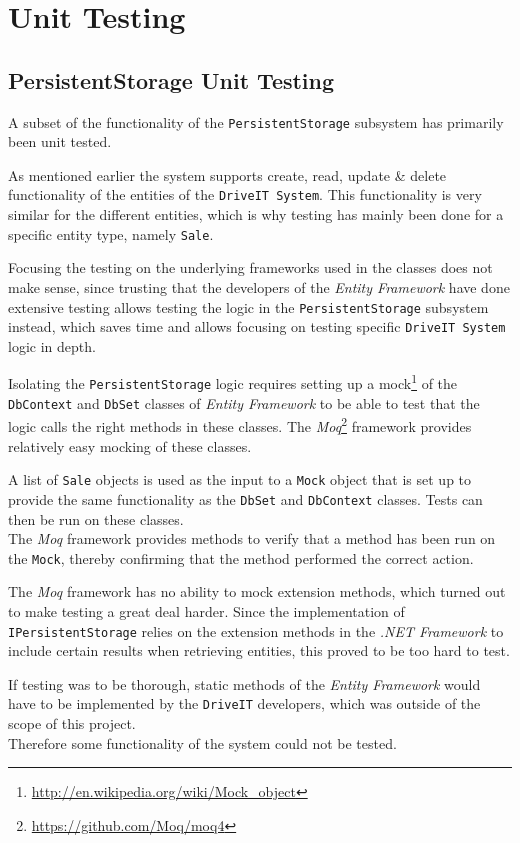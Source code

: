 \section{Unit Testing}
\subsection{PersistentStorage Unit Testing}
A subset of the functionality of the \texttt{PersistentStorage} subsystem has primarily been unit tested.

As mentioned earlier the system supports create, read, update \& delete functionality of the entities of the \texttt{DriveIT System}. This functionality is very similar for the different entities, which is why testing has mainly been done for a specific entity type, namely \texttt{Sale}.

Focusing the testing on the underlying frameworks used in the classes does not make sense, since trusting that the developers of the \textit{Entity Framework} have done extensive testing allows testing the logic in the \texttt{PersistentStorage} subsystem instead, which saves time and allows focusing on testing specific \texttt{DriveIT System} logic in depth.

Isolating the \texttt{PersistentStorage} logic requires setting up a mock\footnote{\url{http://en.wikipedia.org/wiki/Mock_object}} of the \texttt{DbContext} and \texttt{DbSet} classes of \textit{Entity Framework} to be able to test that the logic calls the right methods in these classes. The \textit{Moq}\footnote{\url{https://github.com/Moq/moq4}} framework provides relatively easy mocking of these classes. 

A list of \texttt{Sale} objects is used as the input to a \texttt{Mock} object that is set up to provide the same functionality as the \texttt{DbSet} and \texttt{DbContext} classes. Tests can then be run on these classes.\\
The \textit{Moq} framework provides methods to verify that a method has been run on the \texttt{Mock}, thereby confirming that the method performed the correct action. 

The \textit{Moq} framework has no ability to mock extension methods, which turned out to make testing a great deal harder. Since the implementation of \texttt{IPersistentStorage} relies on the extension methods in the \textit{.NET Framework} to include certain results when retrieving entities, this proved to be too hard to test. 

If testing was to be thorough, static methods of the \textit{Entity Framework} would have to be implemented by the \texttt{DriveIT} developers, which was outside of the scope of this project. \\Therefore some functionality of the system could not be tested.

